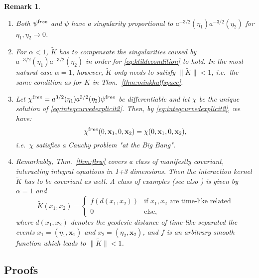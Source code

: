 \documentclass[b5paper,draft,openbib,12pt]{memoir}
\newtheorem{Remark}[Def]{Remark}
\newcommand{\vx}{\mathbf{x}}
\newcommand{\free}{{\textup free}}
\begin{document}
\begin{Remark}
\begin{enumerate}
	\item Both $\psi^\free$ and $\psi$ have a singularity proportional to $a^{-3/2}(\eta_1)a^{-3/2}(\eta_2)$ for $\eta_1, \eta_2 \rightarrow 0$.
%
	\item For $\alpha < 1$, $\widetilde{K}$ has to compensate the singularities caused by $a^{-3/2}(\eta_1) a^{-3/2}(\eta_2)$ in order for \eqref{eq:ktildecondition} to hold. In the most natural case $\alpha = 1$, however, $\widetilde{K}$ only needs to satisfy $\| \widetilde{K} \| < 1$, i.e.\, the same condition as for $K$ in Thm.\ \ref{thm:minkhalfspace}. 
%
	\item Let $\chi^\free = a^{3/2}(\eta_1) a^{3/2}(\eta_2) \psi^\free$ be differentiable and let $\chi$ be the unique solution of \eqref{eq:inteqcurvedexplicit2}. Then, by \eqref{eq:inteqcurvedexplicit2}, we have:
  \begin{equation}
		\chi^\free(0,\vx_1,0,\vx_2) = \chi(0,\vx_1,0,\vx_2),
	\end{equation}
	i.e.\, $\chi$ satisfies a Cauchy problem "at the Big Bang".
%
  \item Remarkably, Thm.\ \ref{thm:flrw} covers a class of manifestly 
  covariant, interacting integral equations in 1+3 dimensions. Then 
  the interaction kernel $\widetilde{K}$ has to be covariant as 
  well. A class of examples (see also \cite{lienertcurved}) is 
  given by $\alpha = 1$ and 
  \begin{equation}
	\widetilde{K}(x_1,x_2) = \left\{ \begin{array}{cl} f(d(x_1,x_2))& \text{if } x_1, x_2 \text{ are time-like related}\\ 0 &  \text{else}, \end{array} \right.
\end{equation}
where \(d(x_1,x_2)\) denotes the geodesic distance 
of time-like separated the events $x_1 = (\eta_1,\vx_1)$ and 
$x_2 = (\eta_2,\vx_2)$, and $f$ is an arbitrary smooth function 
which leads to $\| \widetilde{K} \| < 1$.

\end{enumerate}
\end{Remark}


\subsection{Proofs} \label{sec:proofs}
\end{document}
